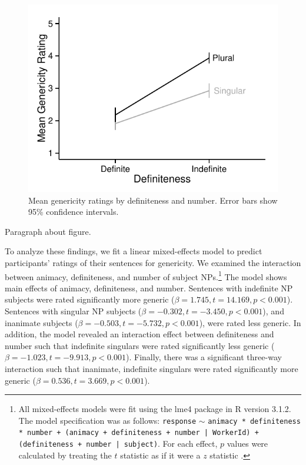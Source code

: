\documentclass[10pt,letterpaper]{article}
\begin{document}
\begin{figure}[t]
\centering
\includegraphics[width=\linewidth]{figures/e1.pdf}
\caption{\label{fig:e1} Mean genericity ratings by definiteness and number. Error bars show 95\% confidence intervals.} 
\end{figure}


Paragraph about figure.

To analyze these findings, we fit a linear mixed-effects model to predict participants' ratings of their sentences for genericity. We examined the interaction between animacy, definiteness, and number of subject NPs.\footnote{All mixed-effects models were fit using the lme4 package in R version 3.1.2. The model specification was as follows: \texttt{response} \(\sim\) \texttt{animacy * definiteness * number + (animacy + definiteness + number | WorkerId) + (definiteness + number | subject)}. For each effect, \(p\) values were calculated by treating the \(t\) statistic as if it were a \(z\) statistic \cite{Barr:2013}.} The model shows main effects of animacy, definiteness, and number. Sentences with indefinite NP subjects were rated significantly more generic (\(\beta = 1.745, t = 14.169, p < 0.001\)). Sentences with singular NP subjects (\(\beta = -0.302, t = -3.450, p < 0.001\)), and inanimate subjects (\(\beta = -0.503, t = -5.732, p < 0.001\)), were rated less generic. In addition, the model revealed an interaction effect between definiteness and number such that indefinite singulars were rated significantly less generic (\(\beta = -1.023, t = -9.913, p < 0.001\)). Finally, there was a significant three-way interaction such that inanimate, indefinite singulars were rated significantly more generic (\(\beta = 0.536, t = 3.669, p < 0.001\)). 
\end{document}

